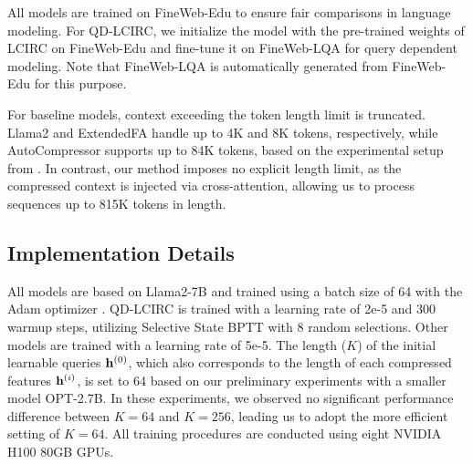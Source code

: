 
All models are trained on FineWeb-Edu to ensure fair comparisons in language modeling. For QD-LCIRC, we initialize the model with the pre-trained weights of LCIRC on FineWeb-Edu and fine-tune it on FineWeb-LQA for query dependent modeling. 
Note that FineWeb-LQA is automatically generated from FineWeb-Edu for this purpose.

For baseline models, context exceeding the token length limit is truncated. Llama2 and ExtendedFA handle up to 4K and 8K tokens, respectively, while AutoCompressor supports up to 84K tokens, based on the experimental setup from \citet{autocompressor}. In contrast, our method imposes no explicit length limit, as the compressed context is injected via cross-attention, allowing us to process sequences up to 815K tokens in length.

\subsection{Implementation Details}
All models are based on Llama2-7B and trained using a batch size of 64 with the Adam optimizer \cite{adam}.
QD-LCIRC is trained with a learning rate of 2e-5 and 300 warmup steps,
utilizing Selective State BPTT with 8 random selections.
Other models are trained with a learning rate of 5e-5.
The length ($K$) of the initial learnable queries $\mathbf{h}^{(0)}$, which also corresponds to the length of each compressed features $\mathbf{h}^{(i)}$, is set to 64 based on our preliminary experiments with a smaller model OPT-2.7B.
In these experiments, we observed no significant performance difference between $K=64$ and $K=256$, leading us to adopt the more efficient setting of $K=64$.
All training procedures are conducted using eight NVIDIA H100 80GB GPUs.

